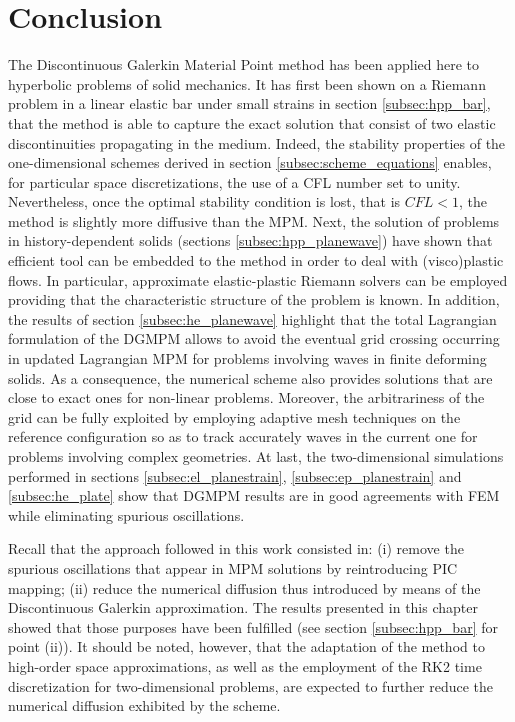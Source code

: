 \section{Conclusion}
The Discontinuous Galerkin Material Point method has been applied here to hyperbolic problems of solid mechanics.
It has first been shown on a Riemann problem in a linear elastic bar under small strains in section \ref{subsec:hpp_bar}, that the method is able to capture the exact solution that consist of two elastic discontinuities propagating in the medium.
Indeed, the stability properties of the one-dimensional schemes derived in section \ref{subsec:scheme_equations} enables, for particular space discretizations, the use of a CFL number set to unity.
Nevertheless, once the optimal stability condition is lost, that is $CFL <1$, the method is slightly more diffusive than the MPM.
Next, the solution of problems in history-dependent solids (sections \ref{subsec:hpp_planewave}) have shown that efficient tool can be embedded to the method in order to deal with (visco)plastic flows. 
In particular, approximate elastic-plastic Riemann solvers can be employed providing that the characteristic structure of the problem is known.
In addition, the results of section \ref{subsec:he_planewave} highlight that the total Lagrangian formulation of the DGMPM allows to avoid the eventual grid crossing occurring in updated Lagrangian MPM for problems involving waves in finite deforming solids.
As a consequence, the numerical scheme also provides solutions that are close to exact ones for non-linear problems.
Moreover, the arbitrariness of the grid can be fully exploited by employing adaptive mesh techniques on the reference configuration so as to track accurately waves in the current one for problems involving complex geometries.
At last, the two-dimensional simulations performed in sections \ref{subsec:el_planestrain}, \ref{subsec:ep_planestrain} and \ref{subsec:he_plate} show that DGMPM results are in good agreements with FEM while eliminating spurious oscillations.

Recall that the approach followed in this work consisted in: (i) remove the spurious oscillations that appear in MPM solutions by reintroducing PIC mapping; (ii) reduce the numerical diffusion thus introduced by means of the Discontinuous Galerkin approximation.
The results presented in this chapter showed that those purposes have been fulfilled (see section \ref{subsec:hpp_bar} for point (ii)).
It should be noted, however, that the adaptation of the method to high-order space approximations, as well as the employment of the RK2 time discretization for two-dimensional problems, are expected to further reduce the numerical diffusion exhibited by the scheme. 


